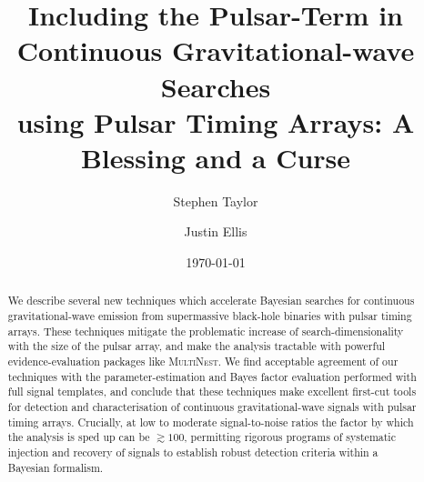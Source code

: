 \documentclass[twocolappendix,tighten]{emulateapj}
\begin{document}
\title{Including the Pulsar-Term in Continuous Gravitational-wave Searches\\ using Pulsar Timing Arrays: A Blessing and a Curse}

\author{Stephen Taylor}
\author{Justin Ellis}

\date{\today}


\begin{abstract}
We describe several new techniques which accelerate Bayesian searches for continuous gravitational-wave emission from supermassive black-hole binaries with pulsar timing arrays. These techniques mitigate the problematic increase of search-dimensionality with the size of the pulsar array, and make the analysis tractable with powerful evidence-evaluation packages like \textsc{MultiNest}. We find acceptable agreement of our techniques with the parameter-estimation and Bayes factor evaluation performed with full signal templates, and conclude that these techniques make excellent first-cut tools for detection and characterisation of continuous gravitational-wave signals with pulsar timing arrays. Crucially, at low to moderate signal-to-noise ratios the factor by which the analysis is sped up can be $\gtrsim 100$, permitting rigorous programs of systematic injection and recovery of signals to establish robust detection criteria within a Bayesian formalism.


\end{abstract}
\end{document}
